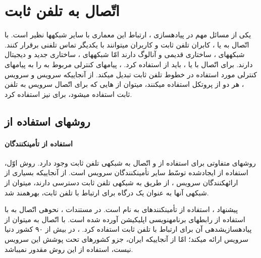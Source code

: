 \chapter{اتّصال به تلفن ثابت}
\label{pstnPart}
یکی از مسائل مهم در پیاده\nf سازی ، ارتباط این معماری با سایر شبکه\nf ها نظیر  است. با اتّصال  به  یا ، کابران تلفن ثابت و کاربران  می\nf توانند با یکدیگر تماس تلفنی برقرار کنند. شبکه\nf های ، ساختاری قدیمی و آنالوگ دارند امّا شبکه\nf های ، ساختاری جدید و دیجیتال دارند. برای اتّصال با  یا ، باید از  استفاده کرد. ، پیام\nf های کنترلی مربوط به  را به پیام\nf های کنترلی مورد استفاده در خطوط تلفن ثابت تبدیل می\nf کند. از آنجایی\nf که سرویس  و سرویس ، هر دو از پروتکل  استفاده می\nf کنند، می\nf توان از هایی که برای اتّصال سرویس  به تلفن ثابت استفاده می\nf شود، برای  نیز استفاده کرد.


\section{روش\nf های استفاده از }
\subsubsection{استفاده از  تأمین\nf کنندگان  }

روش\nf های متفاوتی برای استفاده از  و اتّصال  به شبکه\nf ی تلفن ثابت وجود دارد. روش اوّل، استفاده از  ایجادشده توسّط سایر تأمین\nf کنندگان سرویس  است. از آنجایی\nf که بسیاری از ارائه\nf کنندگان سرویس ، از طریق  به شبکه\nf ی تلفن ثابت دسترسی دارند، می\nf توان از شبکه\nf ی آن\nf ها به عنوان یک درگاه برای ارتباط با تلفن ثابت، بهره\nf مند شد. 

پیشنهاد ، استفاده از تأمین\nf کننده\nf ای به نام  است. در مستندات ، نحوه\nf ی اتّصال به  با استفاده از رابط\nf های برنامه\nf نویسی اپلیکیشن آورده شده است. با اتّصال به  می\nf توان از  پیاده\nf سازی\nf شده\nf ی آن برای ارتباط با تلفن ثابت استفاده کرد. ، در بیش از ۹۰ کشور دنیا سرویس ارائه می\nf کند؛ امّا از آنجایی\nf که ایران، جزو کشورهای تحت پوشش این سرویس نیست، استفاده از این روش مقدور نمی\nf باشد\cite{webvoxbone}\cite{webcw}. 

